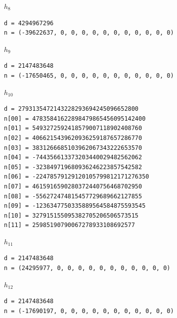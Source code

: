 \par\medskip\noindent\begin{minipage}{\textwidth}
\textbf{$h_{8}$}
\begin{Verbatim}[fontsize=\fontsize{8}{9.4}\selectfont]
d = 4294967296
n = (-39622637, 0, 0, 0, 0, 0, 0, 0, 0, 0, 0, 0)
\end{Verbatim}
\end{minipage}

\par\medskip\noindent\begin{minipage}{\textwidth}
\textbf{$h_{9}$}
\begin{Verbatim}[fontsize=\fontsize{8}{9.4}\selectfont]
d = 2147483648
n = (-17650465, 0, 0, 0, 0, 0, 0, 0, 0, 0, 0, 0)
\end{Verbatim}
\end{minipage}

\par\medskip\noindent\begin{minipage}{\textwidth}
\textbf{$h_{10}$}
\begin{Verbatim}[fontsize=\fontsize{8}{9.4}\selectfont]
d = 2793135472143228293694245096652800
n[00] = 47835841622898479865456095142400
n[01] = 5493272592418579007118902408760
n[02] = 4066215439620936259187657286770
n[03] = 3831266685103962067343222653570
n[04] = -744356613373203440029482562062
n[05] = -323849719680936246223857542582
n[06] = -22478579129120105799812171276350
n[07] = 4615916590280372440756468702950
n[08] = -556272474815457729689662127855
n[09] = -1236347750335889564584875593545
n[10] = 327915155095382705206506573515
n[11] = 25985190790067278933108692577
\end{Verbatim}
\end{minipage}

\par\medskip\noindent\begin{minipage}{\textwidth}
\textbf{$h_{11}$}
\begin{Verbatim}[fontsize=\fontsize{8}{9.4}\selectfont]
d = 2147483648
n = (24295977, 0, 0, 0, 0, 0, 0, 0, 0, 0, 0, 0)
\end{Verbatim}
\end{minipage}

\par\medskip\noindent\begin{minipage}{\textwidth}
\textbf{$h_{12}$}
\begin{Verbatim}[fontsize=\fontsize{8}{9.4}\selectfont]
d = 2147483648
n = (-17690197, 0, 0, 0, 0, 0, 0, 0, 0, 0, 0, 0)
\end{Verbatim}
\end{minipage}

